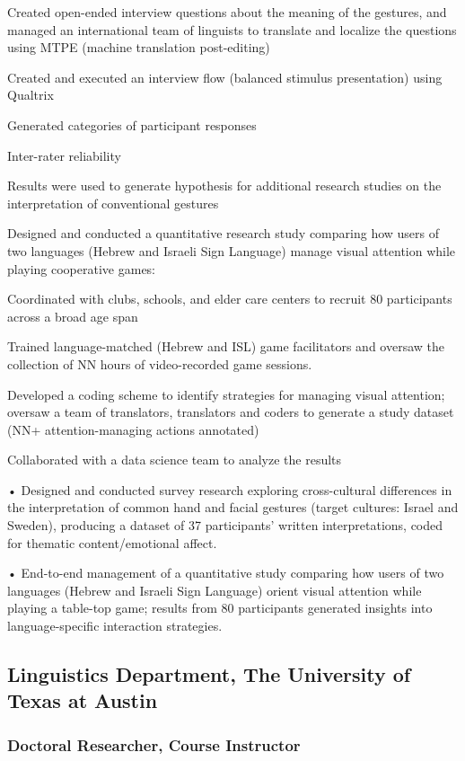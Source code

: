 \documentclass[11pt, oneside]{memoir}
\newcommand{\position}[2]{
     \subsubsection{#1\hfill\mdseries{#2}}}
\begin{document}
Created open-ended interview questions about the meaning of the gestures, and managed an international team of linguists to translate and localize the questions using MTPE (machine translation post-editing)

Created and executed an interview flow (balanced stimulus presentation) using Qualtrix 

Generated categories of participant responses 

Inter-rater reliability

Results were used to generate hypothesis for additional research studies on the interpretation of conventional gestures



Designed and conducted a quantitative research study comparing how users of two languages (Hebrew and Israeli Sign Language) manage visual attention while playing cooperative games: 

Coordinated with clubs, schools, and elder care centers to recruit 80 participants across a broad age span 

Trained language-matched (Hebrew and ISL) game facilitators and oversaw the collection of NN hours of video-recorded game sessions.

Developed a coding scheme to identify strategies for managing visual attention; oversaw a team of translators, translators and coders to generate a study dataset (NN+ attention-managing actions annotated)

Collaborated with a data science team to analyze the results  


• Designed and conducted survey research exploring cross-cultural differences in the interpretation of common hand and facial gestures (target cultures: Israel and Sweden), producing a dataset of 37 participants' written interpretations, coded for thematic content/emotional affect.

• End-to-end management of a quantitative study comparing how users of two languages (Hebrew and Israeli Sign Language) orient visual attention while playing a table-top game; results from 80 participants generated insights into language-specific interaction strategies.

\subsection{Linguistics Department, The University of Texas at Austin}
\position{Doctoral Researcher, Course Instructor}{2011--2017}


 
\end{document}
